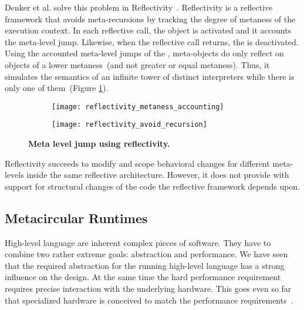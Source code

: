 Denker et al. solve this problem in Reflectivity~\cite{Denk08b}. Reflectivity is a reflective framework that avoids meta-recursions by tracking the degree of metaness of the execution context. In each reflective call, the  object is activated and it accounts the meta-level jump. Likewise, when the reflective call returns, the  is deactivated. Using the accounted meta-level jumps of the , meta-objects do only reflect on objects of a lower metaness~(and not greater or equal metaness). Thus, it simulates the semantics of an infinite tower of distinct interpreters while there is only one of them~(Figure \ref{fig:reflectivity_meta_recursion}).

\begin{figure}[ht]
\begin{center}
\begin{subfigure}{.45\textwidth}
\texttt{[image: reflectivity\_metaness\_accounting]}
\end{subfigure}
\begin{subfigure}{.45\textwidth}
\texttt{[image: reflectivity\_avoid\_recursion]}
\end{subfigure}
\caption{\textbf{Meta level jump using reflectivity.}\label{fig:reflectivity_meta_recursion}
 }
\end{center}
\end{figure}

Reflectivity succeeds to modify and scope behavioral changes for different meta-levels inside the same reflective architecture. However, it does not provide with support for structural changes of the code the reflective framework depends upon.

\subsection{Metacircular Runtimes}

High-level language \VMs are inherent complex pieces of software.
They have to combine two rather extreme goals: abstraction and performance.
We have seen that the required abstraction for the running high-level language has a strong influence on the \VM design.
At the same time the hard performance requirement requires precise interaction with the underlying hardware.
This goes even so far that specialized hardware is conceived to match the performance requirements~\cite{Unga84a,Stef84a,McGh98a,Clic05a}.

